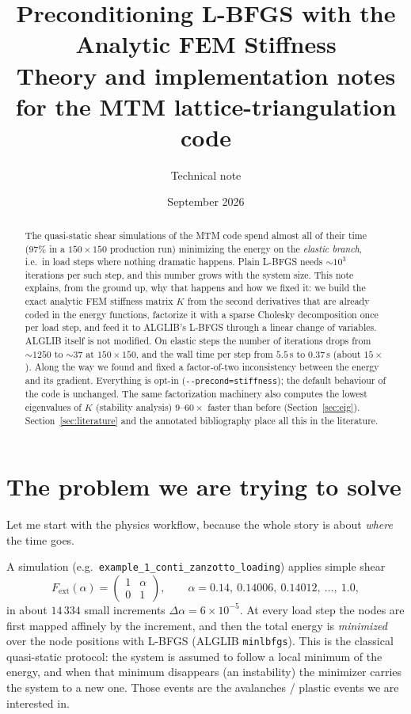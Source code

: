 \documentclass[11pt,a4paper]{article}
\title{Preconditioning L-BFGS with the Analytic FEM Stiffness\\[4pt]
\large Theory and implementation notes for the MTM lattice-triangulation code}
\author{Technical note}
\date{September 2026}
\theoremstyle{remark}
\newcommand{\code}[1]{\texttt{#1}}
\begin{document}
\maketitle

\begin{abstract}
The quasi-static shear simulations of the MTM code spend almost all of their time
(97\% in a $150\times150$ production run) minimizing the energy on the \emph{elastic
branch}, i.e.\ in load steps where nothing dramatic happens. Plain L-BFGS needs
$\sim10^3$ iterations per such step, and this number grows with the system size.
This note explains, from the ground up, why that happens and how we fixed it: we
build the exact analytic FEM stiffness matrix $K$ from the second derivatives that are
already coded in the energy functions, factorize it with a sparse Cholesky
decomposition once per load step, and feed it to ALGLIB's L-BFGS through a linear
change of variables. ALGLIB itself is not modified. On elastic steps the number of
iterations drops from $\sim1250$ to $\sim37$ at $150\times150$, and the wall time per
step from $5.5$\,s to $0.37$\,s (about $15\times$). Along the way we found and fixed a
factor-of-two inconsistency between the energy and its gradient. Everything is
opt-in (\code{-{}-precond=stiffness}); the default behaviour of the code is unchanged.
The same factorization machinery also computes the lowest eigenvalues of $K$ (stability
analysis) $9$--$60\times$ faster than before (Section~\ref{sec:eig}). Section~\ref{sec:literature}
and the annotated bibliography place all this in the literature.
\end{abstract}

\tableofcontents
\newpage

\section{The problem we are trying to solve}

Let me start with the physics workflow, because the whole story is about \emph{where}
the time goes.

A simulation (e.g.\ \code{example\_\allowbreak{}1\_\allowbreak{}conti\_\allowbreak{}zanzotto\_\allowbreak{}loading}) applies simple shear
\begin{equation}
F_{\mathrm{ext}}(\alpha) = \begin{pmatrix} 1 & \alpha \\ 0 & 1\end{pmatrix},
\qquad \alpha = 0.14,\ 0.14006,\ 0.14012,\ \dots,\ 1.0,
\end{equation}
in about $14\,334$ small increments $\Delta\alpha = 6\times10^{-5}$. At every load step the
nodes are first mapped affinely by the increment, and then the total energy is
\emph{minimized} over the node positions with L-BFGS (ALGLIB \code{minlbfgs}). This is
the classical quasi-static protocol: the system is assumed to follow a local minimum of
the energy, and when that minimum disappears (an instability) the minimizer carries the
system to a new one. Those events are the avalanches / plastic events we are interested
in.
\end{document}
